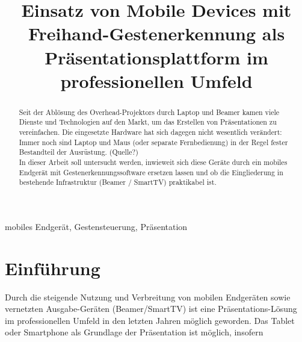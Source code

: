 \documentclass{article}
\title{Einsatz von Mobile Devices mit Freihand-Gestenerkennung als Präsentationsplattform im professionellen Umfeld}
\begin{document}

\maketitle

\begin{abstract}
Seit der Ablösung des Overhead-Projektors durch Laptop und Beamer kamen viele Dienste und Technologien auf den Markt, um das Erstellen von Präsentationen zu vereinfachen. 
Die eingesetzte Hardware hat sich dagegen nicht wesentlich verändert: 
Immer noch sind Laptop und Maus (oder separate Fernbedienung) in der Regel fester Bestandteil der Ausrüstung. (Quelle?) \\
In dieser Arbeit soll untersucht werden, inwieweit sich diese Geräte durch ein mobiles Endgerät mit Gestenerkennungssoftware ersetzen lassen und ob die Eingliederung in bestehende Infrastruktur (Beamer / SmartTV) praktikabel ist.

\end{abstract}
%
\begin{keywords}
mobiles Endgerät, Gestensteuerung, Präsentation
\end{keywords}
%
\section{Einführung}
\label{sec:intro}
Durch die steigende Nutzung und Verbreitung von mobilen Endgeräten sowie vernetzten Ausgabe-Geräten (Beamer/SmartTV) 
ist eine Präsentations-Lösung im professionellen Umfeld in den letzten Jahren möglich geworden. Das Tablet oder Smartphone als Grundlage der Präsentation ist möglich, insofern  

 \cite{C2}



\end{document}

